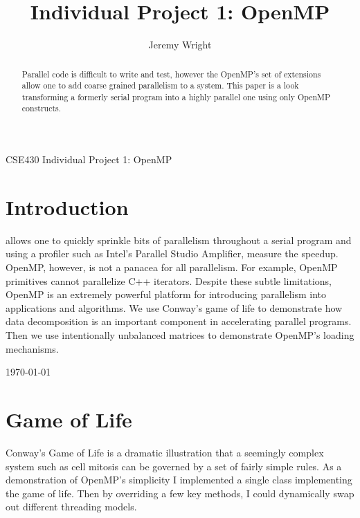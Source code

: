\documentclass[journal,10pt,onecolumn,draftcls]{IEEEtran}
\begin{document}
%
\title{Individual Project 1: OpenMP}
%

\author{Jeremy Wright}

{CSE430 Individual Project 1: OpenMP}

\maketitle


\begin{abstract}
Parallel code is difficult to write and test, however the OpenMP's set of 
extensions allow one to add coarse grained parallelism to a system. This paper 
is a look transforming a formerly serial program into a highly parallel one using 
only OpenMP constructs.
\end{abstract}

\IEEEpeerreviewmaketitle

\section{Introduction}

 allows one to quickly sprinkle bits of parallelism throughout
a serial program and using a profiler such as Intel's Parallel Studio Amplifier, measure 
the speedup.  OpenMP, however, is not a panacea for all parallelism. For example, OpenMP primitives
cannot parallelize C++ iterators.  Despite these 
subtle limitations, OpenMP is an extremely powerful platform for introducing parallelism
into applications and algorithms.  We use Conway's game of life to demonstrate how 
data decomposition is an important component in accelerating parallel programs. Then we 
use intentionally unbalanced matrices to demonstrate OpenMP's loading mechanisms.

\hfill \today

\section{Game of Life}
Conway's Game of Life is a dramatic illustration that a seemingly complex system
such as cell mitosis can be governed by a set of fairly simple rules. As a demonstration of
OpenMP's simplicity I implemented a single class implementing the game of life. Then by 
overriding a few key methods, I could dynamically swap out different threading models.

\end{document}
